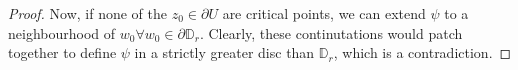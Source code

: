 \begin{proof}
Now, if none of the $z_{0} \in \partial U$ are critical points, we can extend $\psi$ to a neighbourhood of $w_{0} \forall w_{0} \in \partial \mathbb{D}_{r}$. Clearly, these continutations would patch together to define $\psi$ in a strictly greater disc than $\mathbb{D}_{r}$, which is a contradiction.
\end{proof}
